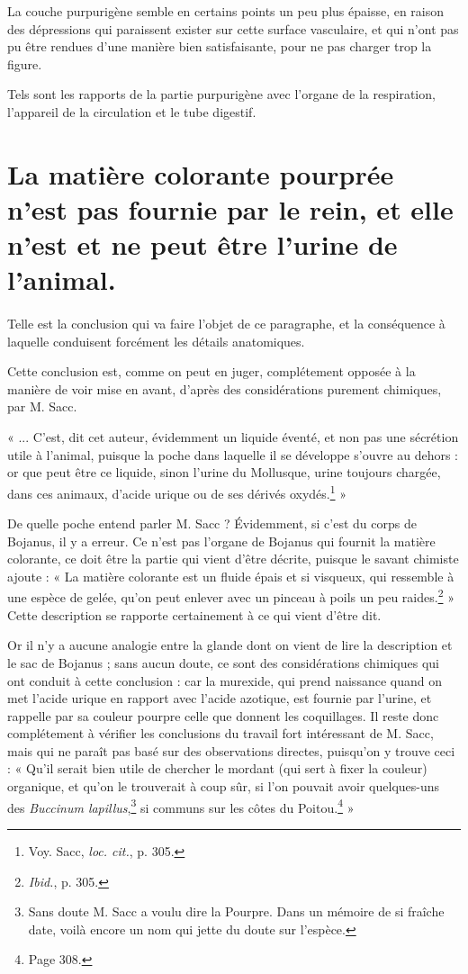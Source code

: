 \documentclass[a4paper, 11pt, oneside, polutonikogreek, french]{article}
\begin{document}
La couche purpurigène semble en certains points un peu plus épaisse, en raison des dépressions qui paraissent exister sur cette surface vasculaire, et qui n'ont pas pu être rendues d'une manière bien satisfaisante, pour ne pas charger trop la figure.

Tels sont les rapports de la partie purpurigène avec l'organe de la respiration, l'appareil de la circulation et le tube digestif.
\clearpage
\section{La matière colorante pourprée n'est pas fournie par le rein, et elle n'est et ne peut être l'urine de l'animal.}
\paragraph{}
Telle est la conclusion qui va faire l'objet de ce paragraphe, et la conséquence à laquelle conduisent forcément les détails anatomiques.

Cette conclusion est, comme on peut en juger, complétement opposée à la manière de voir mise en avant, d'après des considérations purement chimiques, par M. Sacc.

« ... C'est, dit cet auteur, évidemment un liquide éventé, et non pas une sécrétion utile à l'animal, puisque la poche dans laquelle il se développe s'ouvre au dehors : or que peut être ce liquide, sinon l'urine du Mollusque, urine toujours chargée, dans ces animaux, d'acide urique ou de ses dérivés oxydés.\footnote{Voy. Sacc, \emph{loc. cit.}, p. 305.} »

De quelle poche entend parler M. Sacc ? Évidemment, si c'est du corps de Bojanus, il y a erreur. Ce n'est pas l'organe de Bojanus qui fournit la matière colorante, ce doit être la partie qui vient d'être décrite, puisque le savant chimiste ajoute : « La matière colorante est un fluide épais et si visqueux, qui ressemble à une espèce de gelée, qu'on peut enlever avec un pinceau à poils un peu raides.\footnote{\emph{Ibid.}, p. 305.} » Cette description se rapporte certainement à ce qui vient d'être dit.

Or il n'y a aucune analogie entre la glande dont on vient de lire la description et le sac de Bojanus ; sans aucun doute, ce sont des considérations chimiques qui ont conduit à cette conclusion : car la murexide, qui prend naissance quand on met l'acide urique en rapport avec l'acide azotique, est fournie par l'urine, et rappelle par sa couleur pourpre celle que donnent les coquillages. Il reste donc complétement à vérifier les conclusions du travail fort intéressant de M. Sacc, mais qui ne paraît pas basé sur des observations directes, puisqu'on y trouve ceci : « Qu'il serait bien utile de chercher le mordant (qui sert à fixer la couleur) organique, et qu'on le trouverait à coup sûr, si l'on pouvait avoir quelques-uns des \emph{Buccinum lapillus},\footnote{Sans doute M. Sacc a voulu dire la Pourpre. Dans un mémoire de si fraîche date, voilà encore un nom qui jette du doute sur l'espèce.} si communs sur les côtes du Poitou.\footnote{Page 308.} »
\end{document}
